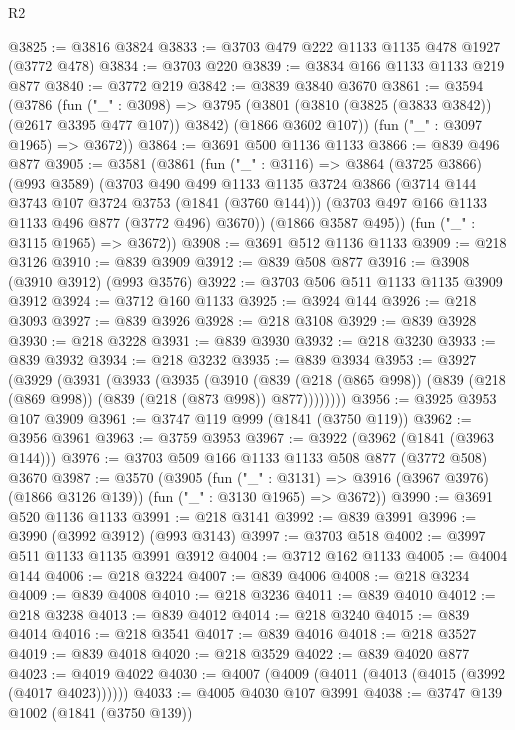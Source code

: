 \begin{lexlean}{R2}
\begin{coremodule}
@3825 := @3816 @3824
@3833 := @3703 @479 @222 @1133 @1135 @478 @1927 (@3772 @478)
@3834 := @3703 @220
@3839 := @3834 @166 @1133 @1133 @219 @877
@3840 := @3772 @219
@3842 := @3839 @3840 @3670
@3861 := @3594
    (@3786
      (fun ("_" : @3098) =>
      @3795 (@3801 (@3810 (@3825 (@3833 @3842)) (@2617 @3395 @477 @107)) @3842) (@1866 @3602 @107))
      (fun ("_" : @3097 @1965) => @3672))
@3864 := @3691 @500 @1136 @1133
@3866 := @839 @496 @877
@3905 := @3581
    (@3861
      (fun ("_" : @3116) =>
      @3864
        (@3725 @3866)
        (@993 @3589)
        (@3703
          @490
          @499
          @1133
          @1135
          @3724
          @3866
          (@3714 @144 @3743 @107 @3724 @3753 (@1841 (@3760 @144)))
          (@3703 @497 @166 @1133 @1133 @496 @877 (@3772 @496) @3670))
        (@1866 @3587 @495))
      (fun ("_" : @3115 @1965) => @3672))
@3908 := @3691 @512 @1136 @1133
@3909 := @218 @3126
@3910 := @839 @3909
@3912 := @839 @508 @877
@3916 := @3908 (@3910 @3912) (@993 @3576)
@3922 := @3703 @506 @511 @1133 @1135 @3909 @3912
@3924 := @3712 @160 @1133
@3925 := @3924 @144
@3926 := @218 @3093
@3927 := @839 @3926
@3928 := @218 @3108
@3929 := @839 @3928
@3930 := @218 @3228
@3931 := @839 @3930
@3932 := @218 @3230
@3933 := @839 @3932
@3934 := @218 @3232
@3935 := @839 @3934
@3953 := @3927
    (@3929
      (@3931
        (@3933
          (@3935
            (@3910
              (@839
                (@218 (@865 @998))
                (@839 (@218 (@869 @998)) (@839 (@218 (@873 @998)) @877))))))))
@3956 := @3925 @3953 @107 @3909
@3961 := @3747 @119 @999 (@1841 (@3750 @119))
@3962 := @3956 @3961
@3963 := @3759 @3953
@3967 := @3922 (@3962 (@1841 (@3963 @144)))
@3976 := @3703 @509 @166 @1133 @1133 @508 @877 (@3772 @508) @3670
@3987 := @3570
    (@3905
      (fun ("_" : @3131) => @3916 (@3967 @3976) (@1866 @3126 @139))
      (fun ("_" : @3130 @1965) => @3672))
@3990 := @3691 @520 @1136 @1133
@3991 := @218 @3141
@3992 := @839 @3991
@3996 := @3990 (@3992 @3912) (@993 @3143)
@3997 := @3703 @518
@4002 := @3997 @511 @1133 @1135 @3991 @3912
@4004 := @3712 @162 @1133
@4005 := @4004 @144
@4006 := @218 @3224
@4007 := @839 @4006
@4008 := @218 @3234
@4009 := @839 @4008
@4010 := @218 @3236
@4011 := @839 @4010
@4012 := @218 @3238
@4013 := @839 @4012
@4014 := @218 @3240
@4015 := @839 @4014
@4016 := @218 @3541
@4017 := @839 @4016
@4018 := @218 @3527
@4019 := @839 @4018
@4020 := @218 @3529
@4022 := @839 @4020 @877
@4023 := @4019 @4022
@4030 := @4007 (@4009 (@4011 (@4013 (@4015 (@3992 (@4017 @4023))))))
@4033 := @4005 @4030 @107 @3991
@4038 := @3747 @139 @1002 (@1841 (@3750 @139))

\end{coremodule}
\end{lexlean}
